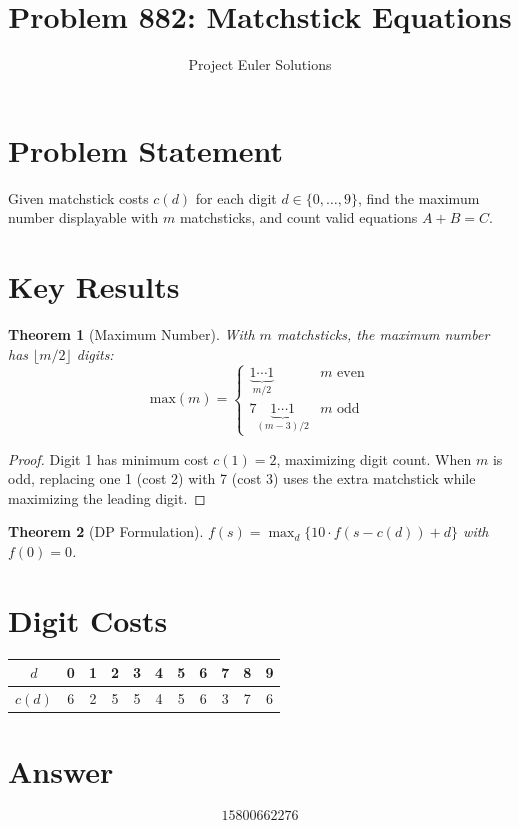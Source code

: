 \documentclass[11pt]{article}
\title{Problem 882: Matchstick Equations}
\author{Project Euler Solutions}
\date{}
\newtheorem{theorem}{Theorem}
\begin{document}
\maketitle

\section{Problem Statement}
Given matchstick costs $c(d)$ for each digit $d \in \{0,\ldots,9\}$, find the maximum number displayable with $m$ matchsticks, and count valid equations $A + B = C$.

\section{Key Results}

\begin{theorem}[Maximum Number]
With $m$ matchsticks, the maximum number has $\lfloor m/2 \rfloor$ digits:
\[
\text{max}(m) = \begin{cases} \underbrace{1\cdots1}_{m/2} & m \text{ even} \\ 7\underbrace{1\cdots1}_{(m-3)/2} & m \text{ odd} \end{cases}
\]
\end{theorem}

\begin{proof}
Digit 1 has minimum cost $c(1)=2$, maximizing digit count. When $m$ is odd, replacing one 1 (cost 2) with 7 (cost 3) uses the extra matchstick while maximizing the leading digit.
\end{proof}

\begin{theorem}[DP Formulation]
$f(s) = \max_{d} \{10 \cdot f(s - c(d)) + d\}$ with $f(0) = 0$.
\end{theorem}

\section{Digit Costs}
\begin{center}
\begin{tabular}{c|cccccccccc}
$d$ & 0 & 1 & 2 & 3 & 4 & 5 & 6 & 7 & 8 & 9 \\ \hline
$c(d)$ & 6 & 2 & 5 & 5 & 4 & 5 & 6 & 3 & 7 & 6
\end{tabular}
\end{center}

\section{Answer}

\[
\boxed{15800662276}
\]
\end{document}
